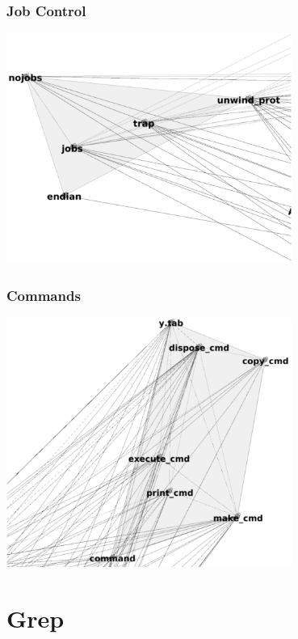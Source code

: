 \documentclass[xetex,mathserif,serif]{beamer}
\begin{document}
	\begin{frame}
		\frametitle{Job Control}
		\begin{center}
			\includegraphics[width=0.7\textwidth]{bashJobControl.png}
		\end{center}
	\end{frame}

	\begin{frame}
		\frametitle{Commands}
		\begin{center}
			\includegraphics[width=0.7\textwidth]{bashCommands.png}
		\end{center}
	\end{frame}

	\section{Grep}
\end{document}
